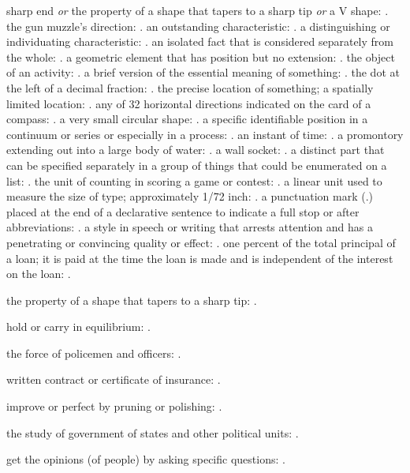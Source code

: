   sharp end \textit{or} the property of a shape that tapers to a sharp tip \textit{or} a V shape: . the gun muzzle's direction: . an outstanding characteristic: . a distinguishing or individuating characteristic: . an isolated fact that is considered separately from the whole: . a geometric element that has position but no extension: . the object of an activity: . a brief version of the essential meaning of something: . the dot at the left of a decimal fraction: . the precise location of something; a spatially limited location: . any of 32 horizontal directions indicated on the card of a compass: . a very small circular shape: . a specific identifiable position in a continuum or series or especially in a process: . an instant of time: . a promontory extending out into a large body of water: . a wall socket: . a distinct part that can be specified separately in a group of things that could be enumerated on a list: . the unit of counting in scoring a game or contest: . a linear unit used to measure the size of type; approximately 1/72 inch: . a punctuation mark (.) placed at the end of a declarative sentence to indicate a full stop or after abbreviations: . a style in speech or writing that arrests attention and has a penetrating or convincing quality or effect: . one percent of the total principal of a loan; it is paid at the time the loan is made and is independent of the interest on the loan: .

  the property of a shape that tapers to a sharp tip: .

  hold or carry in equilibrium: .

  the force of policemen and officers: .

  written contract or certificate of insurance: .

  improve or perfect by pruning or polishing: .

  the study of government of states and other political units: .

  get the opinions (of people) by asking specific questions: .

